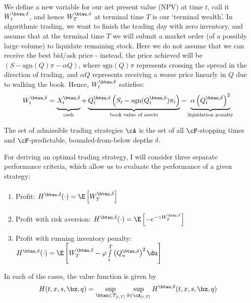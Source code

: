 \documentclass[12pt]{article}
\begin{document}
We define a new variable for our net present value (NPV) at time $t$, call it $W^{\btau, \delta}_t$, and hence $W^{\btau, \delta}_T$ at terminal time $T$ is our `terminal wealth'. In algorithmic trading, we want to finish the trading day with zero inventory, and assume that at the terminal time $T$ we will submit a market order (of a possibly large volume) to liquidate remaining stock. Here we do not assume that we can receive the best bid/ask price - instead, the price achieved will be $(S - \mathrm{sgn}(Q)\pi - \alpha Q)$, where $\mathrm{sgn}(Q)\pi$ represents crossing the spread in the direction of trading, and $\alpha Q$ represents receiving a worse price linearly in $Q$ due to walking the book. Hence, $W^{\btau, \delta}_t$ satisfies:
\begin{equation}
\label{eq:terminalwealth}
W^{\btau, \delta}_t = \underbrace{\vphantom{\left( Q^{\btau, \delta}_t) \right)}X^{\btau, \delta}_t}_{\text{cash}}+ \underbrace{Q^{\btau, \delta}_t \left( S_t - \mathrm{sgn}(Q^{\btau, \delta}_t)\pi_t \right)}_{\text{book value of assets}} - \underbrace{\alpha \left( Q^{\btau, \delta}_t \right)^2}_{\text{liquidation penalty}}
\end{equation}

The set of admissible trading strategies $\cA$ is the set of all $\cF$-stopping times and $\cF$-predictable, bounded-from-below depths $\delta$. 

For deriving an optimal trading strategy, I will consider three separate performance criteria, which allow us to evaluate the performance of a given strategy:
\begin{enumerate}[noitemsep, topsep=0pt]
\item Profit: $H^{\btau, \delta}(\cdot) = \E \left[ W_T^{\btau, \delta} \right]\vphantom{\int\limits_t^T}$
\item Profit with risk aversion: $H^{\btau, \delta}(\cdot) = \E \left[ - e^{-\gamma W_T^{\btau, \delta}} \right] $
\item Profit with running inventory penalty: $H^{\btau, \delta}(\cdot) = \E \left[  W_T^{\btau, \delta}  - \varphi \int\limits_t^T \left( Q^{\btau, \delta}_u \right)^2 \du  \right]$
\end{enumerate}

In each of the cases, the value function is given by
\begin{equation}\label{eq:valuefunction}
H(t,x,s,\bz,q) = \sup\limits_{\btau \in \mathcal{T}_{[t,T]}} \sup\limits_{\delta \in \cA_{[t,T]}} H^{\btau, \delta}(t,x,s,\bz,q)
\end{equation}
\end{document}
